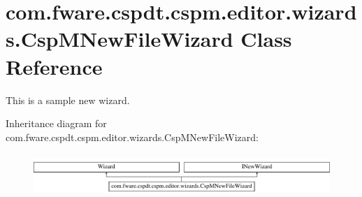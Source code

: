 \hypertarget{classcom_1_1fware_1_1cspdt_1_1cspm_1_1editor_1_1wizards_1_1_csp_m_new_file_wizard}{}\section{com.\+fware.\+cspdt.\+cspm.\+editor.\+wizards.\+Csp\+M\+New\+File\+Wizard Class Reference}
\label{classcom_1_1fware_1_1cspdt_1_1cspm_1_1editor_1_1wizards_1_1_csp_m_new_file_wizard}


This is a sample new wizard.  


Inheritance diagram for com.\+fware.\+cspdt.\+cspm.\+editor.\+wizards.\+Csp\+M\+New\+File\+Wizard\+:\begin{figure}[H]
\begin{center}
\leavevmode
\includegraphics[height=1.595442cm]{classcom_1_1fware_1_1cspdt_1_1cspm_1_1editor_1_1wizards_1_1_csp_m_new_file_wizard}
\end{center}
\end{figure}
